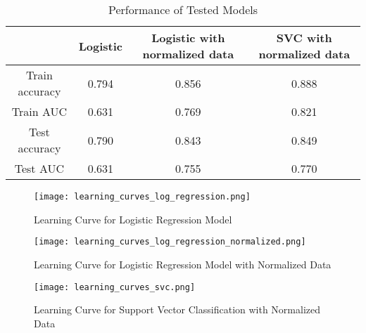 \documentclass[11pt]{article}
\begin{document}
\begin{table}[h]
    \begin{center}
    \begin{tabular}{|c|c|c|c|}
        \hline
        & Logistic & Logistic with normalized data & SVC with normalized data \\
        \hline
        Train accuracy& 0.794 & 0.856 & 0.888 \\
        \hline
        Train AUC& 0.631 & 0.769 & 0.821 \\
        \hline
        Test accuracy& 0.790 & 0.843 & 0.849 \\
        \hline
        Test AUC& 0.631 & 0.755 & 0.770 \\
        \hline
    \end{tabular}
    \end{center}
\caption{Performance of Tested Models}
\label{table:model_performance}
\end{table}

\begin{figure}[h]
\begin{center}
    \texttt{[image: learning\_curves\_log\_regression.png]}
\end{center}
\caption{Learning Curve for Logistic Regression Model}
\label{fig:learning_curve_log}
\end{figure}

\begin{figure}[h]
\begin{center}
    \texttt{[image: learning\_curves\_log\_regression\_normalized.png]}
\end{center}
\caption{Learning Curve for Logistic Regression Model with Normalized Data}
\label{fig:learning_curve_log_norm}
\end{figure}

\begin{figure}[h]
\begin{center}
    \texttt{[image: learning\_curves\_svc.png]}
\end{center}
\caption{Learning Curve for Support Vector Classification with Normalized Data}
\label{fig:learning_curve_svc}
\end{figure}

\pagebreak


\end{document}
